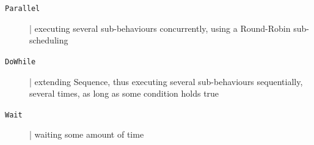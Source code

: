 \documentclass[presentation]{beamer}\mode<presentation>{\usetheme{AMSCesenaPurpleAndGold}}
\begin{document}
\begin{frame}[c, allowframebreaks]
\begin{description}
        \item[\texttt{Parallel}] | executing several sub-behaviours concurrently, using a Round-Robin \alert{sub-scheduling}

        \bigskip

        \item[\texttt{DoWhile}] | extending Sequence, thus executing several sub-behaviours sequentially, several times, as long as some \alert{condition} holds true

        \bigskip

        \item[\texttt{Wait}] | waiting some amount of time

%
%
%
%
%
%
%
    \end{description}


\end{frame}
\end{document}
